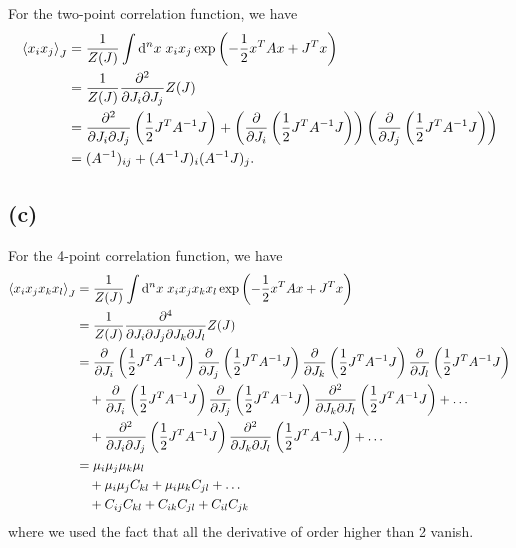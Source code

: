 \documentclass{article}
\begin{document}
For the two-point correlation function, we have
\begin{equation}
    \begin{split}
        \expval{x_i x_j}_J &= \frac{1}{Z(J)} \int \dd^n x \; x_i x_j \exp\left(-\frac{1}{2} x^T A x + J^T x\right)\\
                           &=\frac{1}{Z(J)}\frac{\partial^2}{\partial J_i \partial J_j} Z(J)\\
                           &= \frac{\partial^2}{\partial J_i \partial J_j} \left( \frac{1}{2} J^T A^{-1} J \right) + \left( \frac{\partial}{\partial J_i} \left( \frac{1}{2} J^T A^{-1} J \right) \right) \left( \frac{\partial}{\partial J_j} \left( \frac{1}{2} J^T A^{-1} J \right) \right)\\
                           &=( A^{-1})_{ij} + (A^{-1}J)_i (A^{-1}J)_j.
    \end{split}
\end{equation}

\subsection*{(c)}
For the 4-point correlation function, we have
\begin{equation}
    \begin{split}
        \expval{x_i x_j x_k x_l}_J &= \frac{1}{Z(J)} \int \dd^n x \; x_i x_j x_k x_l \exp\left(-\frac{1}{2} x^T A x + J^T x\right)\\ 
                                   &= \frac{1}{Z(J)} \frac{\partial^4}{\partial J_i \partial J_j \partial J_k \partial J_l} Z(J)\\
                                   &= \frac{\partial}{\partial J_i} \left( \frac{1}{2} J^T A^{-1} J  \right)  \frac{\partial}{\partial J_j} \left( \frac{1}{2} J^T A^{-1} J  \right) \frac{\partial}{\partial J_k} \left( \frac{1}{2} J^T A^{-1} J \right)  \frac{\partial}{\partial J_l} \left( \frac{1}{2} J^T A^{-1} J \right)\\
                                   &\quad+\frac{\partial}{\partial J_i} \left( \frac{1}{2} J^T A^{-1} J  \right)\frac{\partial}{\partial J_j} \left( \frac{1}{2} J^T A^{-1} J  \right)\frac{\partial^2}{\partial J_k \partial J_l} \left( \frac{1}{2} J^T A^{-1} J \right)+\dots\\
                                   &\quad + \frac{\partial^2}{\partial J_i \partial J_j} \left( \frac{1}{2} J^T A^{-1} J \right) \frac{\partial^2}{\partial J_k \partial J_l} \left( \frac{1}{2} J^T A^{-1} J \right)+\dots\\
                                   &=\mu_i \mu_j \mu_k \mu_l\\
                                   &\quad+\mu_i\mu_j C_{kl}+\mu_i\mu_k C_{jl}+\dots\\
                                   &\quad + C_{ij} C_{kl} + C_{ik} C_{jl} + C_{il} C_{jk}
    \end{split}
\end{equation}
where we used the fact that all the derivative of order higher than 2 vanish.



%
%
\end{document}
